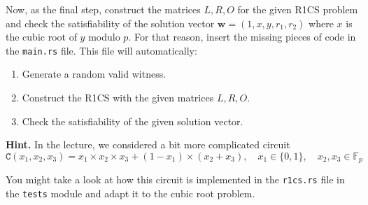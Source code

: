 \documentclass{zkdl-tests-template}
\begin{document}
Now, as the final step, construct the matrices $L,R,O$ for the given R1CS problem and check the satisfiability of the solution vector $\mathbf{w} = (1,x,y,r_1,r_2)$ where $x$ is the cubic root of $y$ modulo $p$. For that reason, insert the missing pieces of code in the \texttt{main.rs} file. This file will automatically:
\begin{enumerate}
    \item Generate a random valid witness.
    \item Construct the R1CS with the given matrices $L,R,O$.
    \item Check the satisfiability of the given solution vector.
\end{enumerate}

\textbf{Hint.} In the lecture, we considered a bit more complicated circuit
\begin{equation*}
    \mathtt{C}(x_1,x_2,x_3) = x_1 \times x_2 \times x_3 + (1-x_1) \times (x_2 + x_3), \quad x_1 \in \{0,1\}, \quad x_2,x_3 \in \mathbb{F}_p
\end{equation*}

You might take a look at how this circuit is implemented in the \texttt{r1cs.rs} file in the \texttt{tests} module and adapt it to the cubic root problem.
\end{document}
